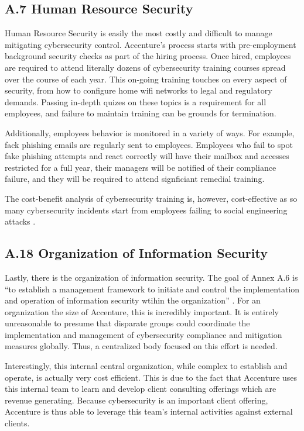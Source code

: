 \subsection{A.7 Human Resource Security}

Human Resource Security is easily the most costly and difficult to manage mitigating cybersecurity control. Accenture's process starts with pre-employment background security checks as part of the hiring process. Once hired, employees are required to attend literally dozens of cybersecurity training courses spread over the course of each year. This on-going training touches on every aspect of security, from how to configure home wifi networks to legal and regulatory demands. Passing in-depth quizes on these topics is a requirement for all employees, and failure to maintain training can be grounds for termination.

Additionally, employees behavior is monitored in a variety of ways. For example, fack phishing emails are regularly sent to employees. Employees who fail to spot fake phishing attempts and react correctly will have their mailbox and accesses restricted for a full year, their managers will be notified of their compliance failure, and they will be required to attend signficiant remedial training.

The cost-benefit analysis of cybersecurity training is, however, cost-effective as so many cybersecurity incidents start from employees failing to social engineering attacks \parencite{zhangCybersecurityAwarenessTraining2021}.

\subsection{A.18 Organization of Information Security}

Lastly, there is the organization of information security. The goal of Annex A.6 is ``to establish a management framework to initiate and control the implementation and operation of information security wtihin the organization'' \parencite{itgovernanceISO270012021}. For an organization the size of Accenture, this is incredibly important. It is entirely unreasonable to presume that disparate groups could coordinate the implementation and management of cybersecurity compliance and mitigation measures globally. Thus, a centralized body focused on this effort is needed.

Interestingly, this internal central organization, while complex to establish and operate, is actually very cost efficient. This is due to the fact that Accenture uses this internal team to learn and develop client consulting offerings which are revenue generating. Because cybersecurity is an important client offering, Accenture is thus able to leverage this team's internal activities against external clients.
